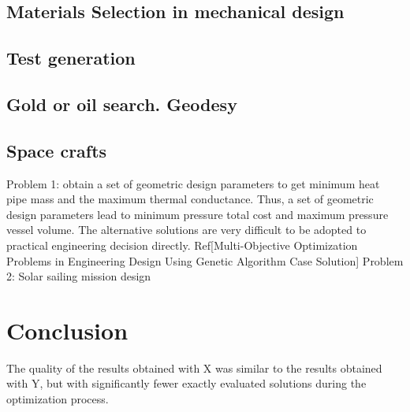     \subsection{Materials Selection in mechanical design}
    \subsection{Test generation}
    \subsection{Gold or oil search. Geodesy}
    \subsection{Space crafts}
        Problem 1: obtain a set of geometric design parameters to get minimum heat pipe mass and the maximum thermal conductance.
        Thus, a set of geometric design parameters lead to minimum pressure total cost and maximum pressure vessel volume. 
        The alternative solutions are very difficult to be adopted to practical engineering decision directly. 
        Ref[Multi-Objective Optimization Problems in Engineering Design Using Genetic Algorithm Case Solution]
        Problem 2: Solar sailing mission design



\section{Conclusion}

The quality of the results obtained with X was similar to the results obtained with Y,
 but with significantly fewer exactly evaluated solutions during the optimization process. 



